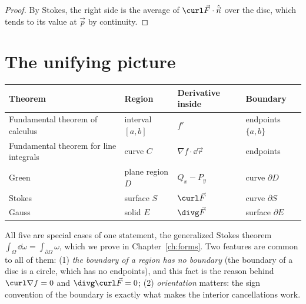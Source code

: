 \begin{proof}
By Stokes, the right side is the average of $\curl\vec F\cdot\hat{\vec n}$ over the disc, which tends to its value at $\vec p$ by continuity.
\end{proof}

\section{The unifying picture}

\begin{center}
\renewcommand{\arraystretch}{1.4}
\begin{tabular}{llll}
\toprule
\textbf{Theorem} & \textbf{Region} & \textbf{Derivative inside} & \textbf{Boundary} \\
\midrule
Fundamental theorem of calculus & interval $[a,b]$ & $f'$ & endpoints $\{a,b\}$ \\
Fundamental theorem for line integrals & curve $C$ & $\nabla f\cdot\dd\vec r$ & endpoints \\
Green & plane region $D$ & $Q_x-P_y$ & curve $\partial D$ \\
Stokes & surface $S$ & $\curl\vec F$ & curve $\partial S$ \\
Gauss & solid $E$ & $\divg\vec F$ & surface $\partial E$ \\
\bottomrule
\end{tabular}
\end{center}

All five are special cases of one statement, the generalized Stokes theorem $\int_\Omega\dd\omega=\int_{\partial\Omega}\omega$, which we prove in Chapter~\ref{ch:forms}. Two features are common to all of them: (1) \emph{the boundary of a region has no boundary} (the boundary of a disc is a circle, which has no endpoints), and this fact is the reason behind $\curl\nabla f=0$ and $\divg\curl\vec F=0$; (2) \emph{orientation} matters: the sign convention of the boundary is exactly what makes the interior cancellations work.


